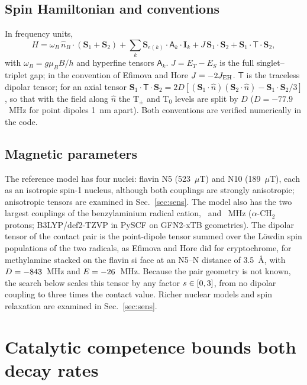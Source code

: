 \documentclass[aip,jcp,amsmath,amssymb,reprint]{revtex4-1}
\begin{document}
\subsection{Spin Hamiltonian and conventions}

In frequency units,
\begin{equation}
H = \omega_B\,\hat n_B\!\cdot(\mathbf S_1+\mathbf S_2)
  + \sum_k \mathbf S_{e(k)}\!\cdot\mathsf A_k\cdot\mathbf I_k
  + J\,\mathbf S_1\!\cdot\!\mathbf S_2
  + \mathbf S_1\!\cdot\mathsf T\cdot\mathbf S_2 ,
\label{eq:H}
\end{equation}
with $\omega_B = g\mu_BB/h$ and hyperfine tensors $\mathsf A_k$. $J = E_T - E_S$
is the full singlet--triplet gap; in the convention of Efimova and
Hore\cite{Efimova2008} $J = -2J_{\rm EH}$. $\mathsf T$ is the traceless dipolar
tensor; for an axial tensor
$\mathbf S_1\!\cdot\mathsf T\cdot\mathbf S_2 =
2D[(\mathbf S_1\!\cdot\hat n)(\mathbf S_2\!\cdot\hat n) - \mathbf S_1\!\cdot\mathbf S_2/3]$,
so that with the field along $\hat n$ the T$_\pm$ and T$_0$ levels are split by
$D$ ($D = -77.9$~MHz for point dipoles 1~nm apart\cite{Efimova2008}). Both
conventions are verified numerically in the code.

\subsection{Magnetic parameters}

The reference model has four nuclei: flavin N5 (523~$\mu$T) and N10
(189~$\mu$T), each as an isotropic spin-1 nucleus,\cite{Lee2014} although both
couplings are strongly anisotropic; anisotropic tensors are examined in
Sec.~\ref{sec:sens}. The model also has the two
largest couplings of the benzylaminium radical cation, \aBenzOne\ and
\aBenzTwo~MHz ($\alpha$-CH$_2$ protons; B3LYP\cite{Becke1993,Lee1988}/def2-TZVP\cite{Weigend2005}
in PySCF\cite{Sun2020} on GFN2-xTB geometries\cite{Bannwarth2019}). The dipolar
tensor of the contact pair is the point-dipole tensor summed over the
Löwdin\cite{Lowdin1950} spin populations of the two radicals, as Efimova and
Hore did for cryptochrome,\cite{Efimova2008}
for methylamine stacked on the flavin si face at an N5--N distance of
3.5~\AA, with $D = -843$~MHz and $E = -26$~MHz. Because the pair
geometry is not known, the search below scales this tensor by any factor
$s\in[0,3]$, from no dipolar coupling to three times the contact value.
Richer nuclear models and spin relaxation are examined in
Sec.~\ref{sec:sens}.

\section{Catalytic competence bounds both decay rates}
\label{sec:bound}
\end{document}
